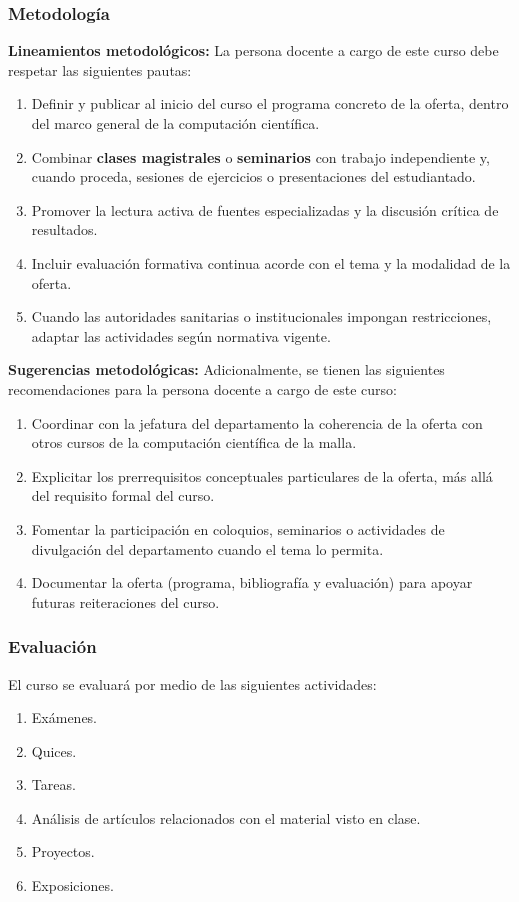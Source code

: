 \begin{refsection}
\subsubsection*{Metodología}

\noindent \textbf{Lineamientos metodológicos:} La persona docente a cargo de este curso debe respetar las siguientes pautas:

\begin{enumerate}
    \item Definir y publicar al inicio del curso el programa concreto de la oferta, dentro del marco general de la computación científica.
    \item Combinar \textbf{clases magistrales} o \textbf{seminarios} con trabajo independiente y, cuando proceda, sesiones de ejercicios o presentaciones del estudiantado.
    \item Promover la lectura activa de fuentes especializadas y la discusión crítica de resultados.
    \item Incluir evaluación formativa continua acorde con el tema y la modalidad de la oferta.
    \item Cuando las autoridades sanitarias o institucionales impongan restricciones, adaptar las actividades según normativa vigente.
\end{enumerate}

\textbf{Sugerencias metodológicas:} Adicionalmente, se tienen las siguientes recomendaciones para la persona docente a cargo de este curso:

\begin{enumerate}
    \item Coordinar con la jefatura del departamento la coherencia de la oferta con otros cursos de la computación científica de la malla.
    \item Explicitar los prerrequisitos conceptuales particulares de la oferta, más allá del requisito formal del curso.
    \item Fomentar la participación en coloquios, seminarios o actividades de divulgación del departamento cuando el tema lo permita.
    \item Documentar la oferta (programa, bibliografía y evaluación) para apoyar futuras reiteraciones del curso.
\end{enumerate}

\subsubsection*{Evaluación}

El curso se evaluará por medio de las siguientes actividades:

\begin{enumerate}
\item Exámenes.
\item Quices.
\item Tareas.
\item Análisis de artículos relacionados con el material visto en clase.
\item Proyectos.
\item Exposiciones.
\end{enumerate}

\end{refsection}
